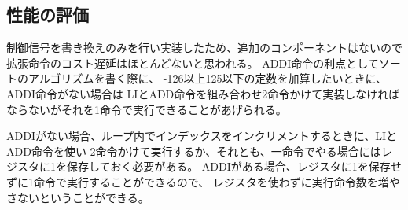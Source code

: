 \documentclass[a4j,titlepage]{jarticle}
\begin{document}
\subsection{性能の評価}
制御信号を書き換えのみを行い実装したため、追加のコンポーネントはないので拡張命令のコスト遅延はほとんどないと思われる。
ADDI命令の利点としてソートのアルゴリズムを書く際に、  -126以上125以下の定数を加算したいときに、ADDI命令がない場合は
LIとADD命令を組み合わせ2命令かけて実装しなければならないがそれを1命令で実行できることがあげられる。

ADDIがない場合、ループ内でインデックスをインクリメントするときに、LIとADD命令を使い
2命令かけて実行するか、それとも、一命令でやる場合にはレジスタに1を保存しておく必要がある。
ADDIがある場合、レジスタに1を保存せずに1命令で実行することができるので、
レジスタを使わずに実行命令数を増やさないということができる。
\end{document}
